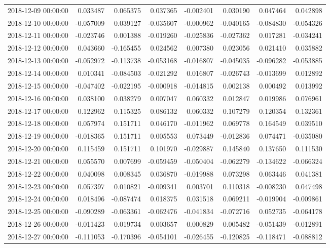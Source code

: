 \begin{tabular}{lrrrrrrr}
2018-12-09 00:00:00 & 0.033487 & 0.065375 & 0.037365 & -0.002401 & 0.030190 & 0.047464 & 0.042898 \\
2018-12-10 00:00:00 & -0.057009 & 0.039127 & -0.035607 & -0.000962 & -0.040165 & -0.084830 & -0.054326 \\
2018-12-11 00:00:00 & -0.023746 & 0.001388 & -0.019260 & -0.025836 & -0.027362 & 0.017281 & -0.034241 \\
2018-12-12 00:00:00 & 0.043660 & -0.165455 & 0.024562 & 0.007380 & 0.023056 & 0.021410 & 0.035882 \\
2018-12-13 00:00:00 & -0.052972 & -0.113738 & -0.053168 & -0.016807 & -0.045035 & -0.096282 & -0.053885 \\
2018-12-14 00:00:00 & 0.010341 & -0.084503 & -0.021292 & 0.016807 & -0.026743 & -0.013699 & 0.012892 \\
2018-12-15 00:00:00 & -0.047402 & -0.022195 & -0.000918 & -0.014815 & 0.002138 & 0.000492 & 0.013992 \\
2018-12-16 00:00:00 & 0.038100 & 0.038279 & 0.007047 & 0.060332 & 0.012847 & 0.019986 & 0.076961 \\
2018-12-17 00:00:00 & 0.122962 & 0.115325 & 0.086132 & 0.060332 & 0.107279 & 0.120354 & 0.132361 \\
2018-12-18 00:00:00 & 0.057974 & 0.151711 & 0.046170 & -0.011962 & 0.069778 & 0.164549 & 0.039510 \\
2018-12-19 00:00:00 & -0.018365 & 0.151711 & 0.005553 & 0.073449 & -0.012836 & 0.074471 & -0.035080 \\
2018-12-20 00:00:00 & 0.115459 & 0.151711 & 0.101970 & -0.029887 & 0.145840 & 0.137650 & 0.111530 \\
2018-12-21 00:00:00 & 0.055570 & 0.007699 & -0.059459 & -0.050404 & -0.062279 & -0.134622 & -0.066324 \\
2018-12-22 00:00:00 & 0.040098 & 0.008345 & 0.036870 & -0.019988 & 0.073298 & 0.063446 & 0.041381 \\
2018-12-23 00:00:00 & 0.057397 & 0.010821 & -0.009341 & 0.003701 & 0.110318 & -0.008230 & 0.047498 \\
2018-12-24 00:00:00 & 0.018496 & -0.087474 & 0.018375 & 0.031518 & 0.069211 & -0.019904 & -0.009861 \\
2018-12-25 00:00:00 & -0.090289 & -0.063361 & -0.062476 & -0.041834 & -0.072716 & 0.052735 & -0.064178 \\
2018-12-26 00:00:00 & -0.011423 & 0.019734 & 0.003657 & 0.000829 & 0.005482 & -0.051439 & -0.012891 \\
2018-12-27 00:00:00 & -0.111053 & -0.170396 & -0.054101 & -0.026455 & -0.120825 & -0.118471 & -0.088812 \\

\end{tabular}
